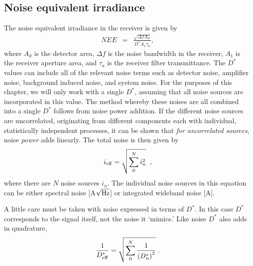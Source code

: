 \subsection{Noise equivalent irradiance}
\noindent
The noise equivalent irradiance in the receiver is given by \cite{Willers2013}
\begin{eqnarray}
NEE&=& \frac{
\sqrt{\Delta f A_d}
}{
D^\ast A_1 \tau_a
},
\label{lrfnoise}\label{laserrxn}
\end{eqnarray}
where 
$A_d$ is the detector area, 
$\Delta f$ is the noise bandwidth in the receiver, 
$A_1$ is the receiver aperture area, and 
$\tau_a$ is the receiver filter transmittance. The
$D^\ast$ values can include all of the relevant noise terms such as detector noise, amplifier noise, background induced noise, and system noise. 
For the purposes of this chapter, we will only work with a single $D^\ast$, assuming that all noise sources are incorporated in this value.
The method whereby these noises are all combined into a single $D^\ast$ follows from noise power addition. If the different noise sources are uncorrelated, originating from different components each with individual, statistically independent processes, it can be shown that \textit{for uncorrelated sources},  noise \textit{power} adds linearly. The total noise is then given by
\begin{equation}
i_{\rm eff}=\sqrt{\sum_0^N i_n^2}\;\;,\label{eq:combinenoisesources}
\end{equation}
where there are $N$ noise sources $i_n$. The individual noise sources in this equation can be either spectral noise [A$\sqrt{\rm Hz}$] or integrated wideband noise [A].

A little care must be taken with noise expressed in terms of $D^\ast$. In this case $D^\ast$ corresponds to the signal itself, not the noise it `mimics.' 
Like noise $D^\ast$ also adds in quadrature,
\begin{equation}
\frac{1}{D^\ast_{\rm eff}}=\sqrt{\sum_0^N 
\frac{1}{\left(D^\ast_n\right)^2}
}\;.\label{eq:combinenoiseDeeStar}
\end{equation}


